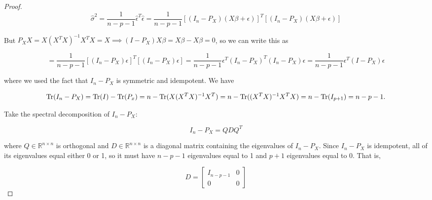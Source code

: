 \begin{proof}
\[
\hat{\sigma}^2 = \frac{1}{n - p - 1} \hat{\epsilon}^T \hat{\epsilon}   = \frac{1}{n - p - 1} \left[  (I_n - P_X )(X \beta + \epsilon) \right] ^T \left[ (I_n - P_X )(X \beta + \epsilon )\right]  
\]

But \(P_X X = X (X^TX)^{-1} X^T X = X \implies (I - P_X) X \beta = X \beta - X \beta = 0\), so we can write this as


\begin{equation}\label{linreg.ols.chisq.resids.proof.1}
 = \frac{1}{n - p - 1} \left[  (I_n - P_X )\epsilon \right] ^T \left[ (I_n - P_X )\epsilon \right]  
 = \frac{1}{n - p - 1} \epsilon^T (I_n - P_X)^T (I_n - P_X )\epsilon   = \frac{1}{n - p - 1} \epsilon^T  (I    -P_X )\epsilon 
\end{equation}


where we used the fact that \(I_n - P_X\) is symmetric and idempotent. We have

\[
\operatorname{Tr}(I_n - P_X) = \operatorname{Tr}(I) - \operatorname{Tr}(P_x) = n - \operatorname{Tr}(X (X^TX)^{-1} X^T) =  n - \operatorname{Tr}( (X^TX)^{-1} X^TX)  = n - \operatorname{Tr}(I_{p+1}) = n - p - 1.
\]

Take the spectral decomposition of \(I_n - P_X\):

\[
I_n - P_X = Q D Q^T
\]

where \(Q \in \mathbb{R}^{n \times n}\) is orthogonal and \(D \in \mathbb{R}^{n \times n}\) is a diagonal matrix containing the eigenvalues of \(I_n - P_X\). Since \(I_n - P_X\) is idempotent, all of its eigenvalues equal either 0 or 1, so it must have \(n - p - 1\) eigenvalues equal to 1 and \(p  + 1\) eigenvalues equal to 0. That is,

\[
D = \begin{bmatrix}
I_{n - p - 1} & 0 \\
0 & 0
\end{bmatrix}
\]

%
%
%


\end{proof}

